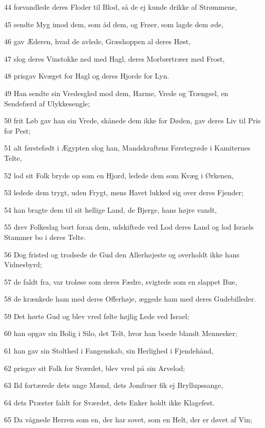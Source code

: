 \par 44 forvandlede deres Floder til Blod, så de ej kunde drikke af Strømmene,
\par 45 sendte Myg imod dem, som åd dem, og Frøer, som lagde dem øde,
\par 46 gav Æderen, hvad de avlede, Græshoppen al deres Høst,
\par 47 slog deres Vinstokke ned med Hagl, deres Morbærtræer med Frost,
\par 48 prisgav Kvæget for Hagl og deres Hjorde for Lyn.
\par 49 Han sendte sin Vredesglød mod dem, Harme, Vrede og Trængsel, en Sendefærd af Ulykkesengle;
\par 50 frit Løb gav han sin Vrede, skånede dem ikke for Døden, gav deres Liv til Pris for Pest;
\par 51 alt førstefødt i Ægypten slog han, Mandskraftens Førstegrøde i Kamiternes Telte,
\par 52 lod sit Folk bryde op som en Hjord, ledede dem som Kvæg i Ørkenen,
\par 53 ledede dem trygt, uden Frygt, mens Havet lukked sig over deres Fjender;
\par 54 han bragte dem til sit hellige Land, de Bjerge, hans højre vandt,
\par 55 drev Folkeslag bort foran dem, udskiftede ved Lod deres Land og lod Israels Stammer bo i deres Telte.
\par 56 Dog fristed og trodsede de Gud den Allerhøjeste og overholdt ikke hans Vidnesbyrd;
\par 57 de faldt fra, var troløse som deres Fædre, svigtede som en slappet Bue,
\par 58 de krænkede ham med deres Offerhøje, æggede ham med deres Gudebilleder.
\par 59 Det hørte Gud og blev vred følte højlig Lede ved Israel;
\par 60 han opgav sin Bolig i Silo, det Telt, hvor han boede blandt Mennesker;
\par 61 han gav sin Stolthed i Fangenskab, sin Herlighed i Fjendehånd,
\par 62 prisgav sit Folk for Sværdet, blev vred på sin Arvelod;
\par 63 Ild fortærede dets unge Mænd, dets Jomfruer fik ej Bryllupssange,
\par 64 dets Præster faldt for Sværdet, dets Enker holdt ikke Klagefest.
\par 65 Da vågnede Herren som en, der har sovet, som en Helt, der er døvet af Vin;
